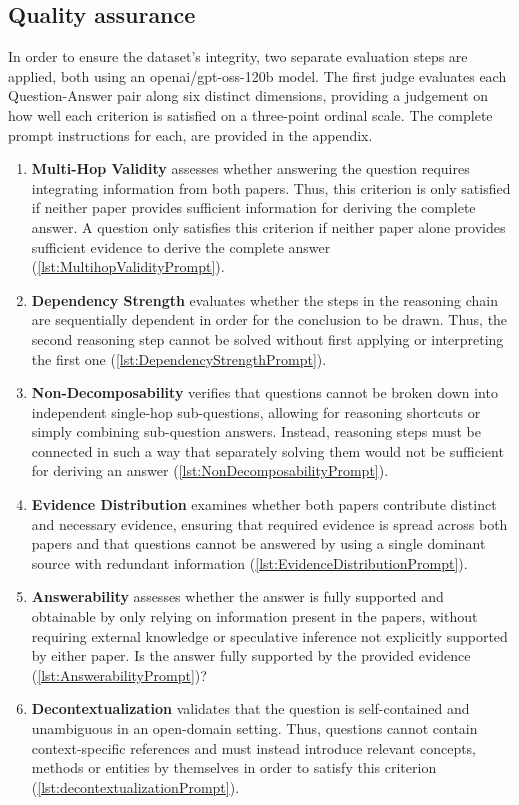 \subsection{Quality assurance}
\label{subsec:quality_assurance}
In order to ensure the dataset's integrity, two separate evaluation steps are applied, both using an openai/gpt-oss-120b \cite{gptoss120B} model.
The first judge evaluates each Question-Answer pair along six distinct dimensions, providing a judgement on how well each criterion is satisfied on a three-point ordinal scale. The complete prompt instructions for each, are provided in the appendix.
\begin{enumerate}
      \item  \textbf{Multi-Hop Validity} assesses whether answering the question requires integrating information from both papers. Thus, this criterion is only satisfied if neither paper provides sufficient information for deriving the complete answer.
      A question only satisfies this criterion if neither paper alone provides sufficient evidence to derive the complete answer (\ref{lst:MultihopValidityPrompt}).
      \item  \textbf{Dependency Strength} evaluates whether the steps in the reasoning chain are sequentially dependent in order for the conclusion to be drawn. Thus, the second reasoning step cannot be solved without first applying or interpreting the first one (\ref{lst:DependencyStrengthPrompt}).
      \item  \textbf{Non-Decomposability} verifies that questions cannot be broken down into independent single-hop sub-questions, allowing for reasoning shortcuts or simply combining sub-question answers. Instead, reasoning steps must be connected in such a way that separately solving them would not be sufficient for deriving an answer (\ref{lst:NonDecomposabilityPrompt}).
      \item  \textbf{Evidence Distribution} examines whether both papers contribute distinct and necessary evidence, ensuring that required evidence is spread across both papers and that questions cannot be answered by using a single dominant source with redundant information (\ref{lst:EvidenceDistributionPrompt}).
      \item  \textbf{Answerability} assesses whether the answer is fully supported and obtainable by only relying on information present in the papers, without requiring external knowledge or speculative inference not explicitly supported by either paper. 
      Is the answer fully supported by the provided evidence (\ref{lst:AnswerabilityPrompt})?
      \item  \textbf{Decontextualization} validates that the question is self-contained and unambiguous in an open-domain setting. Thus, questions cannot contain context-specific references and must instead introduce relevant concepts, methods or entities by themselves in order to satisfy this criterion (\ref{lst:decontextualizationPrompt}).
\end{enumerate}

